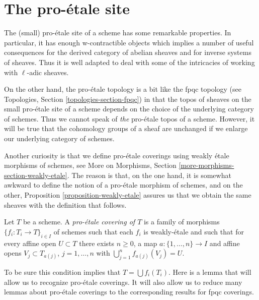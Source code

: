 \section{The pro-\'etale site}
\label{section-proetale}

\noindent
The (small) pro-\'etale site of a scheme has some remarkable properties.
In particular, it has enough w-contractible objects which implies
a number of useful consequences for the derived category
of abelian sheaves and for inverse systems of sheaves. Thus it is
well adapted to deal with some of the intricacies of working
with $\ell$-adic sheaves.

\medskip\noindent
On the other hand, the pro-\'etale topology is a bit like
the fpqc topology (see Topologies, Section \ref{topologies-section-fpqc})
in that the topos of sheaves on the small pro-\'etale site of a scheme
depends on the choice of the underlying category of schemes. Thus we cannot
speak of {\it the} pro-\'etale topos of a scheme. However, it will be
true that the cohomology groups of a sheaf are unchanged if we enlarge
our underlying category of schemes.

\medskip\noindent
Another curiosity is that we define pro-\'etale coverings using weakly
\'etale morphisms of schemes, see
More on Morphisms, Section \ref{more-morphisms-section-weakly-etale}.
The reason is that, on the one hand, it is somewhat awkward to define
the notion of a pro-\'etale morphism of schemes, and on the other,
Proposition \ref{proposition-weakly-etale}
assures us that we obtain the same sheaves with the
definition that follows.

\begin{definition}
\label{definition-fpqc-covering}
Let $T$ be a scheme. A {\it pro-\'etale covering of $T$} is a family
of morphisms $\{f_i : T_i \to T\}_{i \in I}$ of schemes
such that each $f_i$ is weakly-\'etale and such that for every affine open
$U \subset T$ there exists $n \geq 0$, a map
$a : \{1, \ldots, n\} \to I$ and affine opens
$V_j \subset T_{a(j)}$, $j = 1, \ldots, n$
with $\bigcup_{j = 1}^n f_{a(j)}(V_j) = U$.
\end{definition}

\noindent
To be sure this condition implies that $T = \bigcup f_i(T_i)$.
Here is a lemma that will allow us to recognize pro-\'etale coverings.
It will also allow us to reduce many lemmas about pro-\'etale coverings
to the corresponding results for fpqc coverings.

